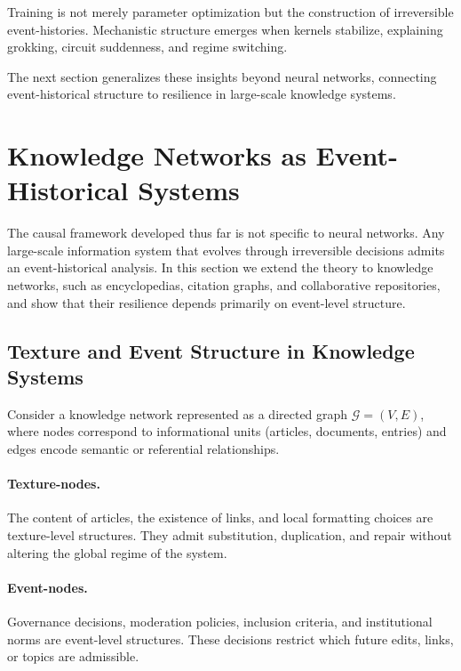 \documentclass[11pt]{article}
\theoremstyle{remark}
\newcommand{\Graph}{\mathcal{G}}
\begin{document}
Training is not merely parameter optimization but the construction of
irreversible event-histories. Mechanistic structure emerges when
kernels stabilize, explaining grokking, circuit suddenness, and regime
switching.

The next section generalizes these insights beyond neural networks,
connecting event-historical structure to resilience in large-scale
knowledge systems.

\section{Knowledge Networks as Event-Historical Systems}

The causal framework developed thus far is not specific to neural
networks. Any large-scale information system that evolves through
irreversible decisions admits an event-historical analysis. In this
section we extend the theory to knowledge networks, such as
encyclopedias, citation graphs, and collaborative repositories, and
show that their resilience depends primarily on event-level structure.

\subsection{Texture and Event Structure in Knowledge Systems}

Consider a knowledge network represented as a directed graph
$\Graph = (V,E)$, where nodes correspond to informational units
(articles, documents, entries) and edges encode semantic or referential
relationships.

\paragraph{Texture-nodes.}
The content of articles, the existence of links, and local formatting
choices are texture-level structures. They admit substitution,
duplication, and repair without altering the global regime of the
system.

\paragraph{Event-nodes.}
Governance decisions, moderation policies, inclusion criteria, and
institutional norms are event-level structures. These decisions
restrict which future edits, links, or topics are admissible.
\end{document}
